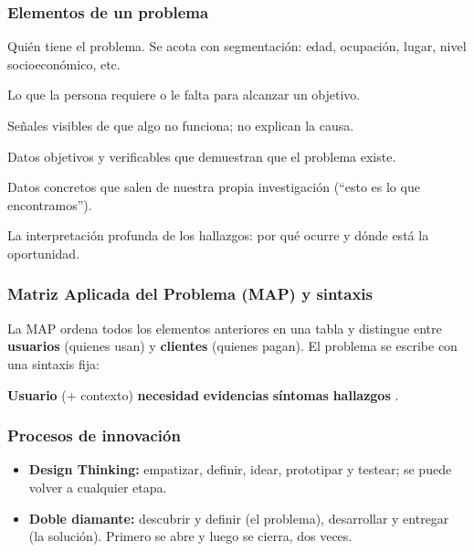\subsubsection{Elementos de un problema}
\begin{description}[leftmargin=2.8cm,style=nextline]
  \item[Usuario y contexto] Quién tiene el problema. Se acota con segmentación: edad, ocupación,
        lugar, nivel socioeconómico, etc.
  \item[Necesidad] Lo que la persona requiere o le falta para alcanzar un objetivo.
  \item[Síntomas] Señales visibles de que algo no funciona; no explican la causa.
  \item[Evidencias] Datos objetivos y verificables que demuestran que el problema existe.
  \item[Hallazgos] Datos concretos que salen de nuestra propia investigación (\enquote{esto es lo que encontramos}).
  \item[Insights] La interpretación profunda de los hallazgos: por qué ocurre y dónde está la oportunidad.
\end{description}

\subsubsection{Matriz Aplicada del Problema (MAP) y sintaxis}
La MAP ordena todos los elementos anteriores en una tabla y distingue entre \textbf{usuarios} (quienes
usan) y \textbf{clientes} (quienes pagan). El problema se escribe con una sintaxis fija:

\begin{center}
\textbf{Usuario} (+ contexto)  \textbf{necesidad}
 \textbf{evidencias}  \textbf{síntomas}
 \textbf{hallazgos} \conector{[insight]}.
\end{center}

\subsubsection{Procesos de innovación}
\begin{itemize}
  \item \textbf{Design Thinking:} empatizar, definir, idear, prototipar y testear; se puede volver a cualquier etapa.
  \item \textbf{Doble diamante:} descubrir y definir (el problema), desarrollar y entregar (la solución).
        Primero se abre y luego se cierra, dos veces.
\end{itemize}

